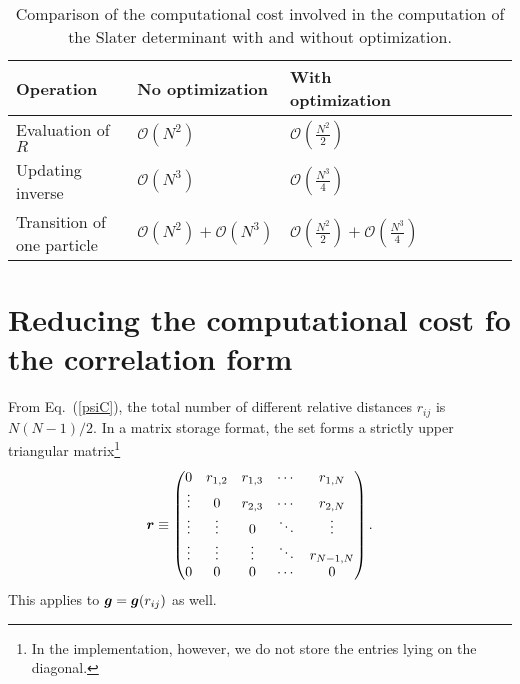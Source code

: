 \begin{table}
\centering
\begin{tabular}{l*{6}{l}l}
\hline
Operation       & No optimization & With optimization\\
\hline
Evaluation of $R$    & $\mathcal{O}(N^2)$ & $\mathcal{O}\left(\frac{N^2}{2}\right)$\\
Updating inverse& $\mathcal{O}(N^3)$ & $\mathcal{O}\left(\frac{N^3}{4}\right)$  \\
Transition of one particle & $\mathcal{O}(N^2) +  \mathcal{O}(N^3)$ & $\mathcal{O}\left(\frac{N^2}{2}\right) + \mathcal{O}\left(\frac{N^3}{4}\right)$\\
\hline
\end{tabular}
\caption{Comparison of the computational cost involved in the computation of  
the Slater determinant with and without optimization.}
\label{performance}
\end{table}


\section{Reducing the computational cost fo the correlation form}\label{optimizingCorrelation}
From Eq.~(\ref{psiC}), the total number of different relative distances $r_{ij}$ is $N(N-1)/2$. In a matrix storage format, the set forms a strictly upper triangular matrix\footnote{In the implementation, however, we do not store the entries lying on the diagonal.}
\begin{equation}\label{utrij}
 \boldsymbol{r} \equiv \begin{pmatrix}
  0 & r_{1,2} & r_{1,3} & \cdots & r_{1,N} \\
  \vdots & 0       & r_{2,3} & \cdots & r_{2,N} \\
  \vdots & \vdots  & 0  & \ddots & \vdots  \\
  \vdots & \vdots  & \vdots  & \ddots  & r_{N-1,N} \\
  0 & 0  & 0  & \cdots  & 0
 \end{pmatrix}.
\end{equation}
This applies to  $\boldsymbol{g} = \boldsymbol{g}(r_{ij})$ as well. 
